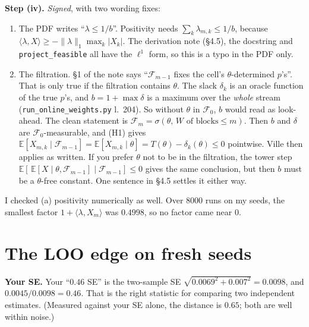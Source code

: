 \documentclass[11pt]{article}
\newcommand{\E}{\mathbb{E}}
\newcommand{\Fc}{\mathcal{F}}
\begin{document}
\textbf{Step (iv).} \emph{Signed}, with two wording fixes:
\begin{enumerate}[nosep,label=(\alph*)]
\item The PDF writes ``$\lambda\le1/b$''. Positivity needs $\sum_k\lambda_{m,k}\le1/b$, because $\langle\lambda,X\rangle\ge-\|\lambda\|_1\max_k|X_k|$. The derivation note (\S4.5), the docstring and \texttt{project\_feasible} all have the $\ell^1$ form, so this is a typo in the PDF only.
\item The filtration. \S1 of the note says ``$\Fc_{m-1}$ fixes the cell's $\theta$-determined $p$'s''. That is only true if the filtration contains $\theta$. The slack $\delta_k$ is an oracle function of the true $p$'s, and $b=1+\max\delta$ is a maximum over the \emph{whole} stream (\texttt{run\_online\_weights.py} l.~204). So without $\theta$ in $\Fc_0$, $b$ would read as look-ahead.
The clean statement is $\Fc_m=\sigma(\theta,\,W\text{ of blocks}\le m)$. Then $b$ and $\delta$ are $\Fc_0$-measurable, and (H1) gives $\E[X_{m,k}\mid\Fc_{m-1}]=\E[X_{m,k}\mid\theta]=T(\theta)-\delta_k(\theta)\le0$ pointwise. Ville then applies as written.
If you prefer $\theta$ not to be in the filtration, the tower step $\E[\,\E[X\mid\theta,\Fc_{m-1}]\mid\Fc_{m-1}]\le0$ gives the same conclusion, but then $b$ must be a $\theta$-free constant. One sentence in \S4.5 settles it either way.
\end{enumerate}
I checked (a) positivity numerically as well. Over $8000$ runs on my seeds, the smallest factor $1+\langle\lambda,X_m\rangle$ was $0.4998$, so no factor came near $0$.

\section{The LOO edge on fresh seeds}\label{sec:loo}
\textbf{Your SE.} Your ``$0.46$ SE'' is the two-sample SE $\sqrt{0.0069^2+0.007^2}=0.0098$, and $0.0045/0.0098=0.46$. That is the right statistic for comparing two independent estimates. (Measured against your SE alone, the distance is $0.65$; both are well within noise.)
\end{document}
